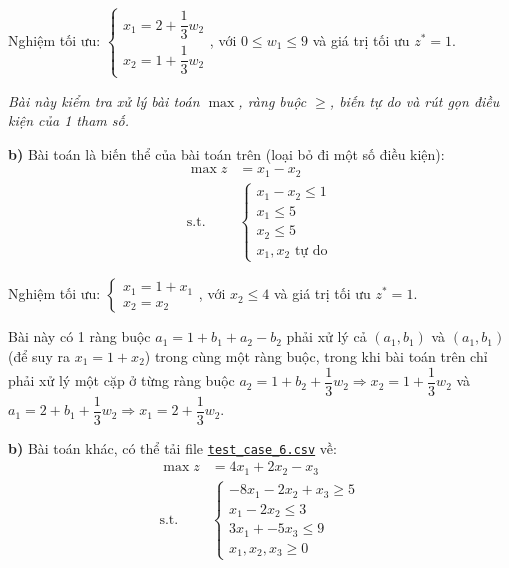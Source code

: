 \documentclass[12pt,a4paper]{article}
\begin{document}
Nghiệm tối ưu: $\begin{cases}
    x_1 = 2 + \dfrac{1}{3}w_2\\
    x_2 = 1 + \dfrac{1}{3}w_2
\end{cases}$, với $0 \leq w_1 \leq 9$ và giá trị tối ưu $z^* = 1$.

\textit{Bài này kiểm tra xử lý bài toán $\max$, ràng buộc $\geq$, biến tự do và rút gọn điều kiện của 1 tham số.}

\noindent \textbf{b)} Bài toán là biến thể của bài toán trên (loại bỏ đi một số điều kiện):
\begin{equation*}
    \begin{aligned}
        \max z &= x_1 - x_2 \\
        \text{s.t.} \quad
        &\begin{cases}
            x_1 - x_2 \leq 1 \\
            x_1 \leq 5 \\
            x_2 \leq 5 \\
            x_1, x_2 \text{ tự do}
        \end{cases}
    \end{aligned}
\end{equation*}

Nghiệm tối ưu: $\begin{cases}
    x_1 = 1 + x_1\\
    x_2 = x_2
\end{cases}$, với $x_2 \leq 4$ và giá trị tối ưu $z^* = 1$.

Bài này có 1 ràng buộc $a_1 = 1 + b_1 + a_2 - b_2$ phải xử lý cả $\left(a_1, b_1\right)$ và $\left(a_1, b_1\right)$ (để suy ra $x_1 = 1 + x_2$) trong cùng một ràng buộc, trong khi bài toán trên chỉ phải xử lý một cặp ở từng ràng buộc $a_2 = 1 + b_2 + \dfrac{1}{3}w_2 \Rightarrow x_2 = 1 + \dfrac{1}{3}w_2$ và $a_1 = 2 + b_1 + \dfrac{1}{3}w_2\Rightarrow x_1 = 2 + \dfrac{1}{3}w_2$.

\noindent \textbf{b)} Bài toán khác, có thể tải file \href{https://drive.google.com/uc?export=download&id=1VtHEzV92zsS2A81G4-6bB8Fz9xFa4D6U}{\texttt{test\_case\_6.csv}} về:
\begin{equation*}
    \begin{aligned}
        \max z &= 4x_1 + 2x_2 - x_3 \\
        \text{s.t.} \quad
        &\begin{cases}
            -8x_1 - 2x_2 +  x_3 \geq 5 \\
            x_1 - 2x_2 \leq  3 \\
            3x_1 + -5x_3 \leq  9 \\
            x_1, x_2, x_3 \geq 0
        \end{cases}
    \end{aligned}
\end{equation*}
\end{document}
